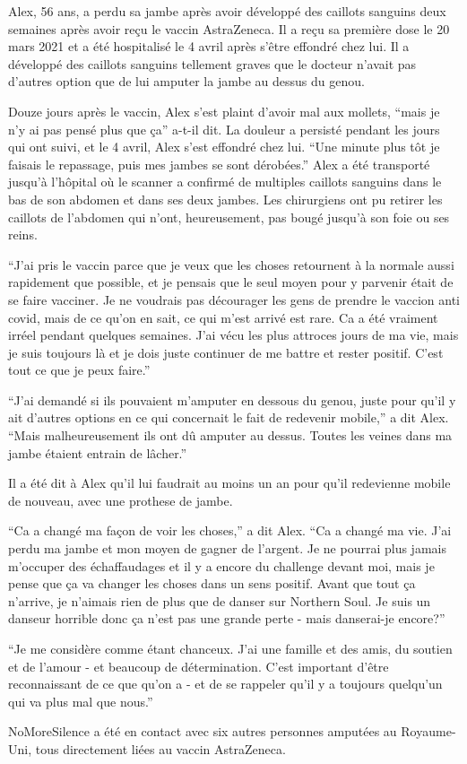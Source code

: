 Alex, 56 ans, a perdu sa jambe après avoir développé des caillots sanguins deux
semaines après avoir reçu le vaccin AstraZeneca. Il a reçu sa première dose le
20 mars 2021 et a été hospitalisé le 4 avril après s'être effondré chez lui. Il
a développé des caillots sanguins tellement graves que le docteur n'avait pas
d'autres option que de lui amputer la jambe au dessus du genou.

Douze jours après le vaccin, Alex s'est plaint d'avoir mal aux mollets, “mais je
n'y ai pas pensé plus que ça” a-t-il dit. La douleur a persisté pendant les
jours qui ont suivi, et le 4 avril, Alex s'est effondré chez lui. “Une minute
plus tôt je faisais le repassage, puis mes jambes se sont dérobées.” Alex a été
transporté jusqu'à l'hôpital où le scanner a confirmé de multiples caillots
sanguins dans le bas de son abdomen et dans ses deux jambes. Les chirurgiens ont
pu retirer les caillots de l'abdomen qui n'ont, heureusement, pas bougé jusqu'à
son foie ou ses reins.

“J'ai pris le vaccin parce que je veux que les choses retournent à la normale
aussi rapidement que possible, et je pensais que le seul moyen pour y parvenir
était de se faire vacciner. Je ne voudrais pas décourager les gens de prendre le
vaccion anti covid, mais de ce qu'on en sait, ce qui m'est arrivé est rare. Ca a
été vraiment irréel pendant quelques semaines. J'ai vécu les plus attroces jours
de ma vie, mais je suis toujours là et je dois juste continuer de me battre et
rester positif. C'est tout ce que je peux faire.”

“J'ai demandé si ils pouvaient m'amputer en dessous du genou, juste pour qu'il y
ait d'autres options en ce qui concernait le fait de redevenir mobile,” a dit
Alex. “Mais malheureusement ils ont dû amputer au dessus. Toutes les veines dans
ma jambe étaient entrain de lâcher.”

Il a été dit à Alex qu'il lui faudrait au moins un an pour qu'il redevienne
mobile de nouveau, avec une prothese de jambe.

“Ca a changé ma façon de voir les choses,” a dit Alex. “Ca a changé ma vie. J'ai
perdu ma jambe et mon moyen de gagner de l'argent. Je ne pourrai plus jamais
m'occuper des échaffaudages et il y a encore du challenge devant moi, mais je
pense que ça va changer les choses dans un sens positif. Avant que tout ça
n'arrive, je n'aimais rien de plus que de danser sur Northern Soul. Je suis un
danseur horrible donc ça n'est pas une grande perte - mais danserai-je encore?”

“Je me considère comme étant chanceux. J'ai une famille et des amis, du soutien
et de l'amour - et beaucoup de détermination. C'est important d'être
reconnaissant de ce que qu'on a - et de se rappeler qu'il y a toujours quelqu'un
qui va plus mal que nous.”

NoMoreSilence a été en contact avec six autres personnes amputées au
Royaume-Uni, tous directement liées au vaccin AstraZeneca.

